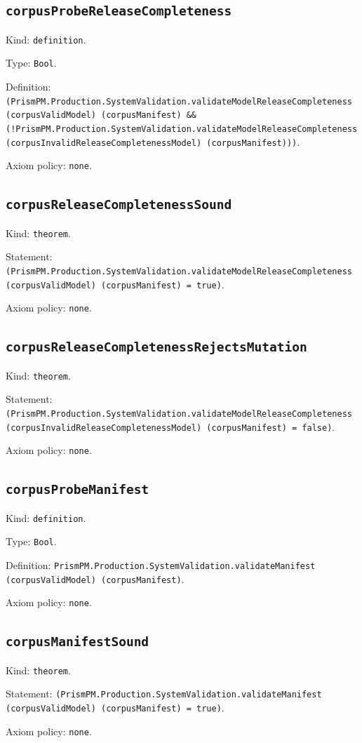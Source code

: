 \documentclass[11pt]{article}
\begin{document}
\subsection*{\texttt{corpusProbeReleaseCompleteness}}
\noindent Kind: \texttt{definition}.\par
\noindent Type: \texttt{Bool}.\par
\noindent Definition: \texttt{(PrismPM.Production.SystemValidation.validateModelReleaseCompleteness (corpusValidModel) (corpusManifest) \&\& (!PrismPM.Production.SystemValidation.validateModelReleaseCompleteness (corpusInvalidReleaseCompletenessModel) (corpusManifest)))}.\par
\noindent Axiom policy: \texttt{none}.\par
\subsection*{\texttt{corpusReleaseCompletenessSound}}
\noindent Kind: \texttt{theorem}.\par
\noindent Statement: \texttt{(PrismPM.Production.SystemValidation.validateModelReleaseCompleteness (corpusValidModel) (corpusManifest) = true)}.\par
\noindent Axiom policy: \texttt{none}.\par
\subsection*{\texttt{corpusReleaseCompletenessRejectsMutation}}
\noindent Kind: \texttt{theorem}.\par
\noindent Statement: \texttt{(PrismPM.Production.SystemValidation.validateModelReleaseCompleteness (corpusInvalidReleaseCompletenessModel) (corpusManifest) = false)}.\par
\noindent Axiom policy: \texttt{none}.\par
\subsection*{\texttt{corpusProbeManifest}}
\noindent Kind: \texttt{definition}.\par
\noindent Type: \texttt{Bool}.\par
\noindent Definition: \texttt{PrismPM.Production.SystemValidation.validateManifest (corpusValidModel) (corpusManifest)}.\par
\noindent Axiom policy: \texttt{none}.\par
\subsection*{\texttt{corpusManifestSound}}
\noindent Kind: \texttt{theorem}.\par
\noindent Statement: \texttt{(PrismPM.Production.SystemValidation.validateManifest (corpusValidModel) (corpusManifest) = true)}.\par
\noindent Axiom policy: \texttt{none}.\par
\end{document}
